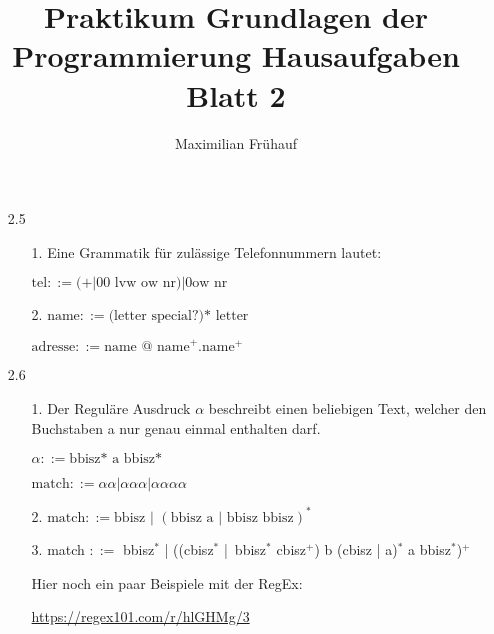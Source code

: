 \documentclass[a4paper, 10pt]{article}
\title{Praktikum Grundlagen der Programmierung Hausaufgaben Blatt 2}
\author{Maximilian Frühauf}
\begin{document}
\maketitle

\begin{enumerate}
	\item[2.5]
	      \begin{enumerate}
		      \item[1.] Eine Grammatik für zulässige Telefonnummern lautet:

		            \( \text{tel} ::= (+ | 00 \text{ lvw ow nr}) | 0 \text{ow nr}\)
		      \item[2.] \( \text{name} ::= \text{(letter special?)* letter } \)

		            \( \text{adresse} ::= \text{name @ name}^+ . \text{name}^+ \)
	      \end{enumerate}
	\item[2.6]
	      \begin{enumerate}
		      \item[1.] Der Reguläre Ausdruck \( \alpha \) beschreibt einen beliebigen Text, welcher den Buchstaben
		            a nur genau einmal enthalten darf.

		            \( \alpha ::= \text{bbisz* a bbisz*} \)

		            \( \text{match} ::=  \alpha\alpha | \alpha\alpha\alpha | \alpha\alpha\alpha\alpha \)
		      \item[2.] \( \text{match} ::= \text{bbisz | } (\text{bbisz a | bbisz bbisz})^* \)
		      \item[3.]
		            match \( ::=  \) bbisz\( ^* \) |
		            ((cbisz\( ^* \) | bbisz\( ^* \) cbisz\( ^+ \)) b (cbisz | a)\( ^* \) a bbisz\( ^* \))\( ^+ \)

		            \vspace{10pt}
		            Hier noch ein paar Beispiele mit der RegEx:

		            \url{https://regex101.com/r/hlGHMg/3}
	      \end{enumerate}
\end{enumerate}
\end{document}
